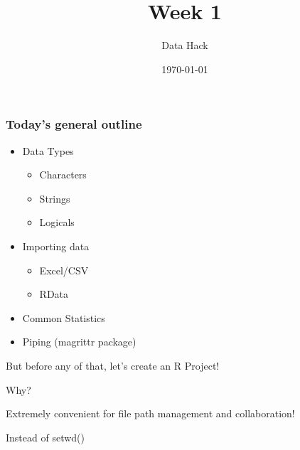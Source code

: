 \documentclass[notes=show]{beamer}
\title[Data Hack 2022]{Week 1}
\date{\today}
\author[Camilo Abbate, Michael Topper]{Data Hack}
\institute[UCSB]{Spring 2022}
\begin{document}
\frame{\titlepage}



\section{}
\begin{frame}[c] \frametitle{Today's general outline}
	
\begin{itemize}
\item Data Types
\begin{itemize}
     \item Characters
     \item Strings
     \item Logicals
     \end{itemize}
		
\item Importing data
\begin{itemize}
     \item Excel/CSV
     \item RData
\end{itemize}

\item Common Statistics

\item Piping (magrittr package)
	
\end{itemize}
	
\end{frame}

\begin{frame}

But before any of that, let's create an R Project!

Why?

Extremely convenient for file path management and collaboration!

\end{frame}


\begin{frame}

Instead of setwd()





\end{frame}
\end{document}

